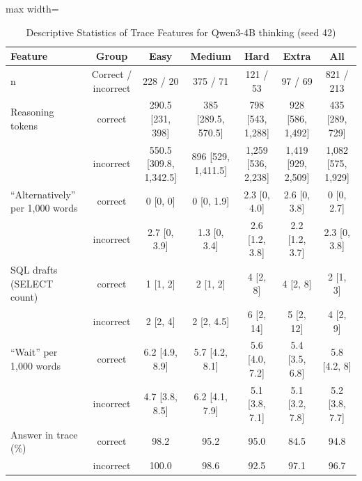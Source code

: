 \begin{table}[!htbp]
\centering
\caption{Descriptive Statistics of Trace Features for Qwen3-4B thinking (seed 42)}
\label{tab:9}
\small
\begin{adjustbox}{max width=\linewidth}
\begin{tabular}{@{}lcccccc@{}}
\toprule
Feature & Group & Easy & Medium & Hard & Extra & All \\
\midrule
n & Correct / incorrect & 228 / 20 & 375 / 71 & 121 / 53 & 97 / 69 & 821 / 213 \\
Reasoning tokens & correct & 290.5 [231, 398] & 385 [289.5, 570.5] & 798 [543, 1,288] & 928 [586, 1,492] & 435 [289, 729] \\
 & incorrect & 550.5 [309.8, 1,342.5] & 896 [529, 1,411.5] & 1,259 [536, 2,238] & 1,419 [929, 2,509] & 1,082 [575, 1,929] \\
\addlinespace
``Alternatively'' per 1,000 words & correct & 0 [0, 0] & 0 [0, 1.9] & 2.3 [0, 4.0] & 2.6 [0, 3.8] & 0 [0, 2.7] \\
 & incorrect & 2.7 [0, 3.9] & 1.3 [0, 3.4] & 2.6 [1.2, 3.8] & 2.2 [1.2, 3.7] & 2.3 [0, 3.8] \\
\addlinespace
SQL drafts (SELECT count) & correct & 1 [1, 2] & 2 [1, 2] & 4 [2, 8] & 4 [2, 8] & 2 [1, 3] \\
 & incorrect & 2 [2, 4] & 2 [2, 4.5] & 6 [2, 14] & 5 [2, 12] & 4 [2, 9] \\
\addlinespace
``Wait'' per 1,000 words & correct & 6.2 [4.9, 8.9] & 5.7 [4.2, 8.1] & 5.6 [4.0, 7.2] & 5.4 [3.5, 6.8] & 5.8 [4.2, 8] \\
 & incorrect & 4.7 [3.8, 8.5] & 6.2 [4.1, 7.9] & 5.1 [3.8, 7.1] & 5.1 [3.2, 7.8] & 5.2 [3.8, 7.7] \\
\addlinespace
Answer in trace (\%) & correct & 98.2 & 95.2 & 95.0 & 84.5 & 94.8 \\
 & incorrect & 100.0 & 98.6 & 92.5 & 97.1 & 96.7 \\
\bottomrule
\end{tabular}
\end{adjustbox}
\par{}
\end{table}

